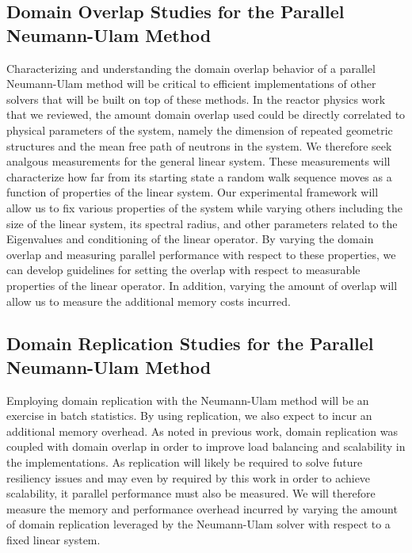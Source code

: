 \subsection{Domain Overlap Studies for the Parallel Neumann-Ulam
  Method}
\label{subsec:domain_overlap_studies}
Characterizing and understanding the domain overlap behavior of a
parallel Neumann-Ulam method will be critical to efficient
implementations of other solvers that will be built on top of these
methods. In the reactor physics work that we reviewed, the amount
domain overlap used could be directly correlated to physical
parameters of the system, namely the dimension of repeated geometric
structures and the mean free path of neutrons in the system. We
therefore seek analgous measurements for the general linear
system. These measurements will characterize how far from its starting
state a random walk sequence moves as a function of properties of the
linear system. Our experimental framework will allow us to fix various
properties of the system while varying others including the size of
the linear system, its spectral radius, and other parameters related
to the Eigenvalues and conditioning of the linear operator. By
varying the domain overlap and measuring parallel performance with
respect to these properties, we can develop guidelines for setting the
overlap with respect to measurable properties of the linear
operator. In addition, varying the amount of overlap will allow us to
measure the additional memory costs incurred. 

\subsection{Domain Replication Studies for the Parallel Neumann-Ulam
  Method}
\label{subsec:domain_replication_studies}
Employing domain replication with the Neumann-Ulam method will be an
exercise in batch statistics. By using replication, we also expect to
incur an additional memory overhead. As noted in previous work, domain
replication was coupled with domain overlap in order to improve load
balancing and scalability in the implementations. As replication will
likely be required to solve future resiliency issues and may even by
required by this work in order to achieve scalability, it parallel
performance must also be measured. We will therefore measure the
memory and performance overhead incurred by varying the amount of
domain replication leveraged by the Neumann-Ulam solver with respect
to a fixed linear system.

